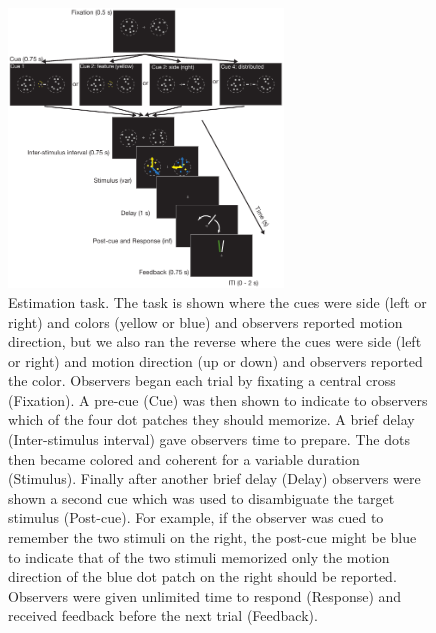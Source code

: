 \begin{figure}
\centering
\includegraphics[keepaspectratio,width=0.65\textwidth]{figs_c4/f4_estimationtask.pdf}
\caption[Estimation task]{Estimation task. The task is shown where the cues were side (left or right) and colors (yellow or blue) and observers reported motion direction, but we also ran the reverse where the cues were side (left or right) and motion direction (up or down) and observers reported the color. Observers began each trial by fixating a central cross (Fixation). A pre-cue (Cue) was then shown to indicate to observers which of the four dot patches they should memorize. A brief delay (Inter-stimulus interval) gave observers time to prepare. The dots then became colored and coherent for a variable duration (Stimulus). Finally after another brief delay (Delay) observers were shown a second cue which was used to disambiguate the target stimulus (Post-cue). For example, if the observer was cued to remember the two stimuli on the right, the post-cue might be blue to indicate that of the two stimuli memorized only the motion direction of the blue dot patch on the right should be reported. Observers were given unlimited time to respond (Response) and received feedback before the next trial (Feedback).}
\label{fig:c4f4}
\end{figure}

